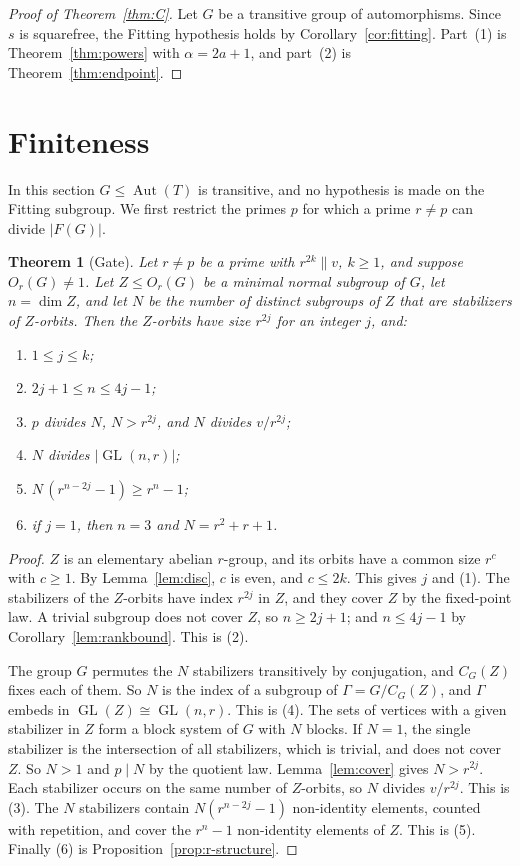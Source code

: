 \documentclass[11pt]{amsart}
\newtheorem{theorem}{Theorem}
\theoremstyle{definition}
\theoremstyle{remark}
\newcommand{\Aut}{\operatorname{Aut}}
\newcommand{\GL}{\operatorname{GL}}
\begin{document}
\begin{proof}[Proof of Theorem~\ref{thm:C}]
Let $G$ be a transitive group of automorphisms. Since $s$ is squarefree, the Fitting hypothesis holds by Corollary~\ref{cor:fitting}. Part~(1) is Theorem~\ref{thm:powers} with $\alpha=2a+1$, and part~(2) is Theorem~\ref{thm:endpoint}.
\end{proof}

\section{Finiteness}\label{sec:finite}

In this section $G\le\Aut(T)$ is transitive, and no hypothesis is made on the Fitting subgroup. We first restrict the primes $p$ for which a prime $r\ne p$ can divide $|F(G)|$.

\begin{theorem}[Gate]\label{thm:gate}
Let $r\ne p$ be a prime with $r^{2k}\parallel v$, $k\ge1$, and suppose $O_r(G)\ne1$. Let $Z\le O_r(G)$ be a minimal normal subgroup of $G$, let $n=\dim Z$, and let $N$ be the number of distinct subgroups of $Z$ that are stabilizers of $Z$-orbits. Then the $Z$-orbits have size $r^{2j}$ for an integer $j$, and:
\begin{enumerate}
\item $1\le j\le k$;
\item $2j+1\le n\le4j-1$;
\item $p$ divides $N$, $N>r^{2j}$, and $N$ divides $v/r^{2j}$;
\item $N$ divides $|\GL(n,r)|$;
\item $N\,(r^{n-2j}-1)\ge r^n-1$;
\item if $j=1$, then $n=3$ and $N=r^2+r+1$.
\end{enumerate}
\end{theorem}
\begin{proof}
$Z$ is an elementary abelian $r$-group, and its orbits have a common size $r^c$ with $c\ge1$. By Lemma~\ref{lem:disc}, $c$ is even, and $c\le2k$. This gives $j$ and (1). The stabilizers of the $Z$-orbits have index $r^{2j}$ in $Z$, and they cover $Z$ by the fixed-point law. A trivial subgroup does not cover $Z$, so $n\ge2j+1$; and $n\le4j-1$ by Corollary~\ref{lem:rankbound}. This is (2).

The group $G$ permutes the $N$ stabilizers transitively by conjugation, and $C_G(Z)$ fixes each of them. So $N$ is the index of a subgroup of $\Gamma=G/C_G(Z)$, and $\Gamma$ embeds in $\GL(Z)\cong\GL(n,r)$. This is (4). The sets of vertices with a given stabilizer in $Z$ form a block system of $G$ with $N$ blocks. If $N=1$, the single stabilizer is the intersection of all stabilizers, which is trivial, and does not cover $Z$. So $N>1$ and $p\mid N$ by the quotient law. Lemma~\ref{lem:cover} gives $N>r^{2j}$. Each stabilizer occurs on the same number of $Z$-orbits, so $N$ divides $v/r^{2j}$. This is (3). The $N$ stabilizers contain $N(r^{n-2j}-1)$ non-identity elements, counted with repetition, and cover the $r^n-1$ non-identity elements of $Z$. This is (5). Finally (6) is Proposition~\ref{prop:r-structure}.
\end{proof}
\end{document}
